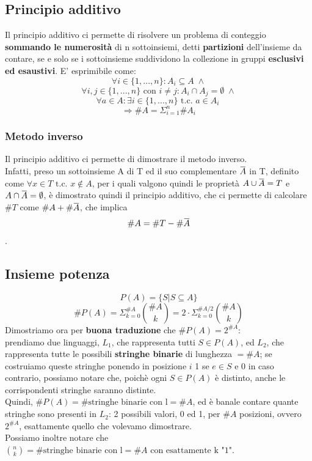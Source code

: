 \documentclass{report}
\newcommand{\overbar}[1]{\mkern 1.5mu\overline{\mkern-1.5mu#1\mkern-1.5mu}\mkern 1.5mu}
\begin{document}
    \subsection{Principio additivo}
        Il principio additivo ci permette di risolvere un problema di conteggio
        \textbf{sommando le numerosità} di n sottoinsiemi, detti \textbf{partizioni} dell'insieme da contare,
        se e solo se i sottoinsieme suddividono la collezione in gruppi \textbf{esclusivi ed esaustivi}.
        E' esprimibile come:
        $$ \forall i \in \{1, ..., n\}: A_i \subseteq A \; \wedge $$
        $$ \forall i,j \in \{1, ..., n\} \textrm{ con } i \neq j: A_i \cap A_j = \emptyset \; \wedge $$
        $$ \forall a \in A: \exists i \in \{1, ..., n\} \textrm{ t.c. } a \in A_i \ $$
        $$ \Longrightarrow \#A = \Sigma_{i=1}^{n} \#A_i $$
        \subsubsection{Metodo inverso}
            Il principio additivo ci permette di dimostrare il metodo inverso. \\
            Infatti, preso un sottoinsieme A di T ed il suo complementare $\overbar{A}$ in T, definito come
            $\forall x \in T \textrm{ t.c. } x \notin A$, per i quali valgono quindi le proprietà
            $A \cup \overbar{A} = T$ e $A \cap \overbar{A} = \emptyset$, è dimostrato quindi 
            il principio additivo, che ci permette di calcolare $\#T$ come $\#A + \#\overbar{A}$, che implica
            $$\#A = \#T - \#\overbar{A}$$.
    \subsection{Insieme potenza}
        $$P(A) = \{S | S \subseteq A\}$$
        $$\#P(A) = \Sigma_{k=0}^{\#A}\binom{\#A}{k} = 2\cdot\Sigma_{k=0}^{\#A/2}\binom{\#A}{k}$$
        Dimostriamo ora per \textbf{buona traduzione} che $\#P(A) = 2^{\#A}$: \\
        prendiamo due linguaggi, $L_1$, che rappresenta tutti $S \in P(A)$, ed
        $L_2$, che rappresenta tutte le possibili \textbf{stringhe binarie} di 
        lunghezza $ = \#A$; se costruiamo queste stringhe ponendo in posizione
        $i$ 1 se $e \in S$ e 0 in caso contrario, possiamo notare che, poichè
        ogni $S \in P(A)$ è distinto, anche le corrispondenti stringhe saranno distinte. \\
        Quindi, $\#P(A) = \#\textrm{stringhe binarie con l} = \#A$, ed è banale contare 
        quante stringhe sono presenti in $L_2$: 2 possibili valori, 0 ed 1, per $\#A$
        posizioni, ovvero $2^{\#A}$, esattamente quello che volevamo dimostrare. \\
        Possiamo inoltre notare che $\binom{n}{k} = \#\textrm{stringhe binarie con l} = \#A
        \textrm{ con esattamente k "1"}$.
\end{document}
